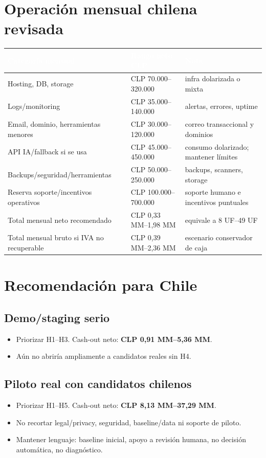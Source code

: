 \documentclass[11pt,a4paper]{article}
\begin{document}
\section{Operación mensual chilena revisada}
\begin{tabularx}{\linewidth}{@{}L>{\raggedleft\arraybackslash}p{3.4cm}X@{}}
\toprule
{}\textcolor{white}{\textbf{Categoría mensual}} & \textcolor{white}{\textbf{Rango neto CLP}} & \textcolor{white}{\textbf{Nota}} \\
\midrule
Hosting, DB, storage & CLP 70.000--320.000 & infra dolarizada o mixta \\
Logs/monitoring & CLP 35.000--140.000 & alertas, errores, uptime \\
Email, dominio, herramientas menores & CLP 30.000--120.000 & correo transaccional y dominios \\
API IA/fallback si se usa & CLP 45.000--450.000 & consumo dolarizado; mantener límites \\
Backups/seguridad/herramientas & CLP 50.000--250.000 & backups, scanners, storage \\
Reserva soporte/incentivos operativos & CLP 100.000--700.000 & soporte humano e incentivos puntuales \\
Total mensual neto recomendado & CLP 0,33 MM--1,98 MM & equivale a 8 UF--49 UF \\
Total mensual bruto si IVA no recuperable & CLP 0,39 MM--2,36 MM & escenario conservador de caja \\

\bottomrule
\end{tabularx}

\section{Recomendación para Chile}
\subsection{Demo/staging serio}
\begin{itemize}
\item Priorizar H1--H3. Cash-out neto: \textbf{CLP 0,91 MM--5,36 MM}.

\item Aún no abriría ampliamente a candidatos reales sin H4.
\end{itemize}
\subsection{Piloto real con candidatos chilenos}
\begin{itemize}
\item Priorizar H1--H5. Cash-out neto: \textbf{CLP 8,13 MM--37,29 MM}.

\item No recortar legal/privacy, seguridad, baseline/data ni soporte de piloto.
\item Mantener lenguaje: baseline inicial, apoyo a revisión humana, no decisión automática, no diagnóstico.
\end{itemize}
\end{document}
